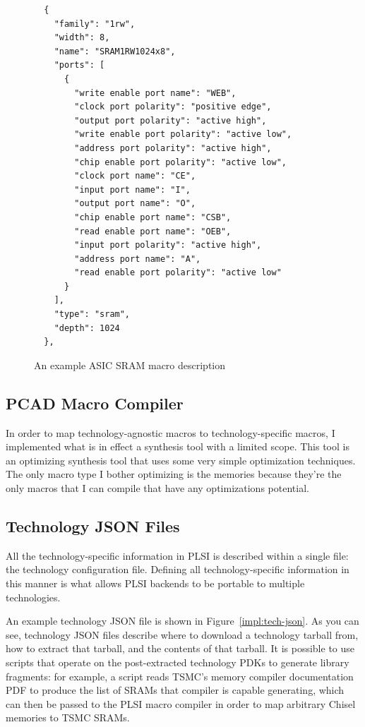 \documentclass{article}
\begin{document}
\begin{figure}
\begin{verbatim}
  {
    "family": "1rw",
    "width": 8,
    "name": "SRAM1RW1024x8",
    "ports": [
      {
        "write enable port name": "WEB",
        "clock port polarity": "positive edge",
        "output port polarity": "active high",
        "write enable port polarity": "active low",
        "address port polarity": "active high",
        "chip enable port polarity": "active low",
        "clock port name": "CE",
        "input port name": "I",
        "output port name": "O",
        "chip enable port name": "CSB",
        "read enable port name": "OEB",
        "input port polarity": "active high",
        "address port name": "A",
        "read enable port polarity": "active low"
      }
    ],
    "type": "sram",
    "depth": 1024
  },
\end{verbatim}
  \caption{An example ASIC SRAM macro description}
  \label{impl:tech-macro-list}
\end{figure}

\subsection{PCAD Macro Compiler}

In order to map technology-agnostic macros to technology-specific macros, I
implemented what is in effect a synthesis tool with a limited scope.  This tool
is an optimizing synthesis tool that uses some very simple optimization
techniques.  The only macro type I bother optimizing is the memories because
they're the only macros that I can compile that have any optimizations
potential.



\subsection{Technology JSON Files}

All the technology-specific information in PLSI is described within a single
file: the technology configuration file.  Defining all technology-specific
information in this manner is what allows PLSI backends to be portable to
multiple technologies.

An example technology JSON file is shown in Figure~\ref{impl:tech-json}.  As
you can see, technology JSON files describe where to download a technology
tarball from, how to extract that tarball, and the contents of that tarball.
It is possible to use scripts that operate on the post-extracted technology
PDKs to generate library fragments: for example, a script reads TSMC's memory
compiler documentation PDF to produce the list of SRAMs that compiler is
capable generating, which can then be passed to the PLSI macro compiler in
order to map arbitrary Chisel memories to TSMC SRAMs.
\end{document}
